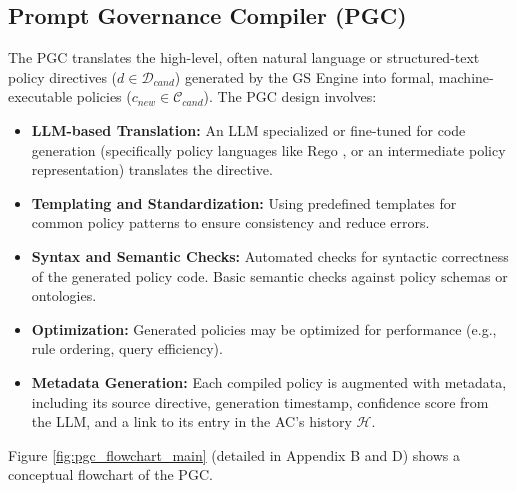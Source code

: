 \documentclass[sigconf,review,screen]{acmart}
\begin{document}
\subsection{Prompt Governance Compiler (PGC)}
The PGC translates the high-level, often natural language or structured-text policy directives ($d \in \mathcal{D}_{cand}$) generated by the GS Engine into formal, machine-executable policies ($c_{new} \in \mathcal{C}_{cand}$).
The PGC design involves:
\begin{itemize}
    \item \textbf{LLM-based Translation:} An LLM specialized or fine-tuned for code generation (specifically policy languages like Rego \cite{opa2021}, or an intermediate policy representation) translates the directive.
    \item \textbf{Templating and Standardization:} Using predefined templates for common policy patterns to ensure consistency and reduce errors.
    \item \textbf{Syntax and Semantic Checks:} Automated checks for syntactic correctness of the generated policy code. Basic semantic checks against policy schemas or ontologies.
    \item \textbf{Optimization:} Generated policies may be optimized for performance (e.g., rule ordering, query efficiency).
    \item \textbf{Metadata Generation:} Each compiled policy is augmented with metadata, including its source directive, generation timestamp, confidence score from the LLM, and a link to its entry in the AC's history $\mathcal{H}$.
\end{itemize}
Figure \ref{fig:pgc_flowchart_main} (detailed in Appendix B and D) shows a conceptual flowchart of the PGC.
\end{document}

